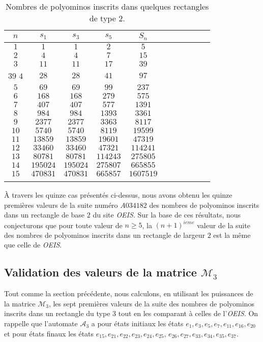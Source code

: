 \begin{small}
\begin{longtable}{|c|c|c|c|c|c|c|c|c|c|c|} 
\hline
$n$&$s_{1}$&$s_{3}$&$s_{5}$&$S_{n}$\\
\hline
$1$& $ 1 $&  $1 $& $ 2$&$ 5$\\
\hline
$2$& $ 4$& $ 4$& $ 7$&$15 $\\
\hline
$3$& $11 $& $11 $& $17 $&$39 $\\
\hline39
$4$& $ 28$& $28 $& $ 41$&$ 97$\\
\hline
$5$& $69 $& $69 $& $99 $&$237 $\\
\hline
$6$& $168$& $168$& $279$&$575$\\
\hline
$7$&$407$ &$407$ &$577$ &$1391$\\
\hline
$8$&$984$ & $984$&$1393$ &$ 3361
$\\
\hline
$9$& $2377$& $2377$&$3363$ &$8117$\\
\hline
$10$&$5740$ &$5740$ & $8119$&$19599$\\
\hline
$11$& $13859$&$13859$ & $19601$&$47319$\\
\hline
$12$&$33460$ & $33460$& $47321$&$114241$\\
\hline
$13$&$80781$ & $80781$& $114243$&$275805
$\\
\hline
$14$&$195024$ & $195024$&$275807$ &$665855$\\
\hline
$15$& $470831$&$470831$& $665857$&$1607519$\\
\hline
\caption{\label{v2} Nombres de polyominos inscrits dans quelques rectangles de type $2$.}
\end{longtable}
\end{small}
À travers les quinze cas présentés  ci-dessus, nous avons obtenu les quinze premières valeurs de la suite numéro $A034182 $ des nombres de polyominos inscrits dans un rectangle de base $2$ du site \emph{OEIS}. Sur la base de ces résultats, nous conjecturons que pour toute valeur de $n\geq 5$, la $(n+1)^{ieme}$ valeur de la suite des nombres de polyominos inscrits dans un rectangle de largeur $2$ est la même que celle de \emph{OEIS}.
\begin{spacing}{0.30}
\subsection{Validation des valeurs de la matrice $\mathcal{M}_{3}$}
\end{spacing}
Tout comme la section précédente, nous calculons, en utilisant les puissances de la matrice $\mathcal{M}_{3}$, les sept premières valeurs de la suite des nombres de polyominos inscrits dans un rectangle du type $3$ tout en les comparant à celles de l'\emph{OEIS}. On rappelle que  l'automate $\mathcal{A}_{3 }$ a pour   états  initiaux les états $e_{1}, e_{3}, e_{5}, e_{7}, e_{11}, e_{16}, e_{20}$ et pour états finaux les états $e_{15},  e_{21}, e_{22}, e_{23}, e_{24}, e_{25}$, $ e_{26}, e_{27}, e_{33}, e_{34},  e_{35},  e_{37}. $

